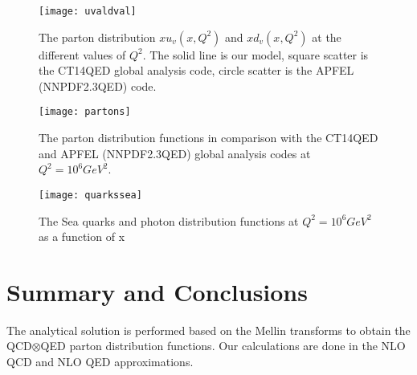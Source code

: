 \documentclass[review]{elsarticle}
\begin{document}
\begin{figure}
\begin{centering}
\texttt{[image: uvaldval]}
\par\end{centering}
\caption{The parton distribution $xu_{v}(x,Q^{2})$ and $xd_{v}(x,Q^{2})$
at the different values of $Q^{2}$. The solid line is our model,
square scatter is the CT14QED global analysis code, circle scatter is the APFEL (NNPDF2.3QED) code. }
\label{fig1}
\end{figure}

\begin{figure}
\begin{centering}
\texttt{[image: partons]}
\par\end{centering}
\caption{The parton distribution functions in comparison with the CT14QED and
APFEL (NNPDF2.3QED) global analysis codes
 at $Q^{2}=10^{6}GeV^{2}$.}

\label{fig2}
\end{figure}

\begin{figure}
\begin{centering}
\texttt{[image: quarkssea]}
\par\end{centering}
\caption{The Sea quarks and photon distribution functions at $Q^{2}=10^{6}GeV^{2}$
as a function of x}
\label{fig3}
\end{figure}

\section{Summary and Conclusions}
The analytical solution is performed based on the Mellin transforms
to obtain the QCD$\otimes$QED parton distribution functions. Our
calculations are done in the NLO QCD and NLO QED approximations.
\end{document}
